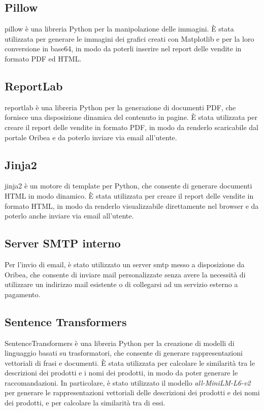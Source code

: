 \subsection{Pillow}
\gls{pillow} è una libreria Python per la manipolazione delle immagini. È stata utilizzata per generare le immagini dei grafici creati con Matplotlib e per la loro conversione in base64, in modo da poterli inserire nel report delle vendite in formato PDF ed HTML.

\subsection{ReportLab}
\gls{reportlab} è una libreria Python per la generazione di documenti PDF, che fornisce una disposizione dinamica del contenuto in pagine. È stata utilizzata per creare il report delle vendite in formato PDF, in modo da renderlo scaricabile dal portale Oribea e da poterlo inviare via email all'utente.

\subsection{Jinja2}
\gls{jinja2} è un motore di template per Python, che consente di generare documenti HTML in modo dinamico. È stata utilizzata per creare il report delle vendite in formato HTML, in modo da renderlo visualizzabile direttamente nel browser e da poterlo anche inviare via email all'utente.

\subsection{Server SMTP interno}
Per l'invio di email, è stato utilizzato un server \gls{smtp} messo a disposizione da Oribea, che consente di inviare mail personalizzate senza avere la necessità di utilizzare un indirizzo mail esistente o di collegarsi ad un servizio esterno a pagamento. 

\subsection{Sentence Transformers}
SentenceTransformers è una libreria Python per la creazione di modelli di linguaggio basati su trasformatori, che consente di generare rappresentazioni vettoriali di frasi e documenti. È stata utilizzata per calcolare le similarità tra le descrizioni dei prodotti e i nomi dei prodotti, in modo da poter generare le raccomandazioni. In particolare, è stato utilizzato il modello \emph{all-MiniLM-L6-v2} per generare le rappresentazioni vettoriali delle descrizioni dei prodotti e dei nomi dei prodotti, e per calcolare la similarità tra di essi.

